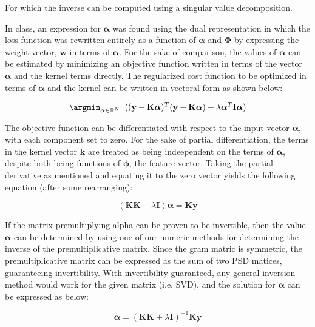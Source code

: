 For which the inverse can be computed using a singular value decomposition.

In class, an expression for $\boldsymbol\alpha$ was found using the dual representation in which the loss function was rewritten entirely as a function of $\boldsymbol\alpha$ and $\mathbf{\Phi}$ by expressing the weight vector, $\mathbf{w}$ in terms of $\boldsymbol\alpha$. For the sake of comparison, the values of $\boldsymbol\alpha$ can be estimated by minimizing an objective function written in terms of the vector $\boldsymbol\alpha$ and the kernel terms directly. The regularized cost function to be optimized in terms of $\boldsymbol\alpha$ and the kernel can be written in vectoral form as shown below:

\begin{equation}
\argmin_{\boldsymbol\alpha \in \mathbb{R}^N} \;\; ( (\mathbf{y} - \mathbf{K}\boldsymbol\alpha)^T (\mathbf{y} - \mathbf{K}\boldsymbol\alpha) + \lambda \boldsymbol\alpha^T \mathbf{I} \boldsymbol\alpha)
\end{equation}

The objective function can be differentiated with respect to the input vector $\boldsymbol\alpha$, with each component set to zero. For the sake of partial differentiation, the terms in the kernel vector $\mathbf{k}$ are treated as being indeependent on the terms of $\boldsymbol\alpha$, despite both being functions of $\boldsymbol\phi$, the feature vector. Taking the partial derivative as mentioned and equating it to the zero vector yields the following equation (after some rearranging):

\begin{equation}
(\mathbf{K} \mathbf{K} + \lambda \mathbf{I}) \boldsymbol\alpha = \mathbf{Ky}
\end{equation}

If the matrix premultiplying alpha can be proven to be invertible, then the value $\boldsymbol\alpha$ can be determined by using one of our numeric methods for determining the inverse of the premultiplicative matrix. Since the gram matric is symmetric, the premultiplicative matrix can be expressed as the sum of two PSD matices, guaranteeing invertibility. With invertibility guaranteed, any general inversion method would work for the given matrix (i.e. SVD), and the solution for $\boldsymbol\alpha$ can be expressed as below:

\begin{equation}
\boldsymbol\alpha = (\mathbf{KK} + \lambda \mathbf{I})^{-1}\mathbf{Ky}
\end{equation}

